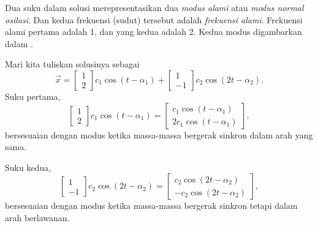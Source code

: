\begin{example}
Dua suku dalam solusi merepresentasikan dua
\emph{modus alami}
atau \emph{modus normal osilasi}.
Dan kedua frekuensi (sudut) tersebut adalah
\emph{frekuensi alami}.
Frekuensi alami pertama adalah 1, dan yang kedua adalah 2.
Kedua modus digambarkan dalam .

\begin{myfig}
\capstart
\caption{Dua modus sistem massa-pegas.  Pada grafik sebelah kiri,
massa-massa bergerak serempak, dan pada grafik sebelah kanan massa-massa bergerak dalam
arah berlawanan.\label{sosa:modesfig}}
\end{myfig}

Mari kita tuliskan solusinya sebagai
\begin{equation*}
\vec{x} = 
\begin{bmatrix} 1 \\ 2 \end{bmatrix}
c_1 \cos (t - \alpha_1 )
+
\begin{bmatrix} 1 \\ -1 \end{bmatrix}
c_2 \cos (2t - \alpha_2 ) .
\end{equation*}
Suku pertama,
\begin{equation*}
\begin{bmatrix} 1 \\ 2 \end{bmatrix}
c_1 \cos (t - \alpha_1 )
=
\begin{bmatrix}
c_1 \cos (t - \alpha_1 ) \\
2c_1 \cos (t - \alpha_1 )
\end{bmatrix} ,
\end{equation*}
bersesuaian dengan modus ketika massa-massa bergerak sinkron
dalam arah yang sama.

Suku kedua,
\begin{equation*}
\begin{bmatrix} 1 \\ -1 \end{bmatrix}
c_2 \cos (2t - \alpha_2 )
=
\begin{bmatrix}
c_2 \cos (2t - \alpha_2 ) \\
- c_2 \cos (2t - \alpha_2 )
\end{bmatrix} ,
\end{equation*}
bersesuaian dengan modus ketika massa-massa bergerak sinkron
tetapi dalam arah berlawanan.


\end{example}
